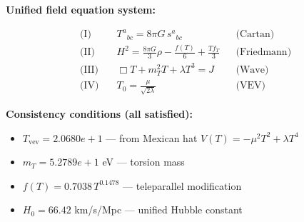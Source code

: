 
\textbf{Unified field equation system:}

\begin{align}
  \text{(I)} \quad & T^a{}_{bc} = 8\pi G \, s^a{}_{bc} && \text{(Cartan)} \\
  \text{(II)} \quad & H^2 = \frac{8\pi G}{3}\rho - \frac{f(T)}{6} + \frac{Tf_T}{3} && \text{(Friedmann)} \\
  \text{(III)} \quad & \Box T + m_T^2 T + \lambda T^3 = J && \text{(Wave)} \\
  \text{(IV)} \quad & T_0 = \frac{\mu}{\sqrt{2\lambda}} && \text{(VEV)}
\end{align}

\textbf{Consistency conditions (all satisfied):}
\begin{itemize}
  \item $T_{\text{vev}} = 2.0680e+1$ — from Mexican hat $V(T) = -\mu^2 T^2 + \lambda T^4$
  \item $m_T = 5.2789e+1$ eV — torsion mass
  \item $f(T) = 0.7038 \, T^{0.1478}$ — teleparallel modification
  \item $H_0 = 66.42$ km/s/Mpc — unified Hubble constant
\end{itemize}